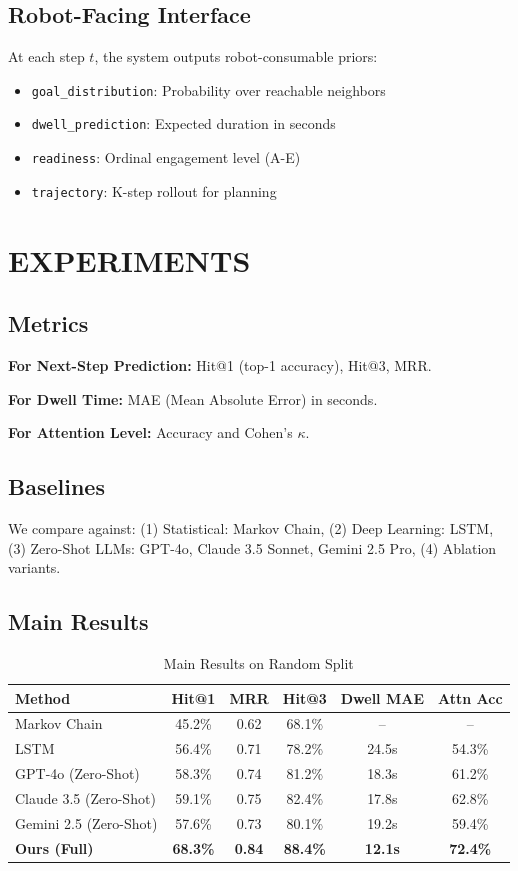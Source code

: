 \documentclass{article}
\begin{document}
\subsection{Robot-Facing Interface}

At each step $t$, the system outputs robot-consumable priors:
\begin{itemize}
    \item \texttt{goal\_distribution}: Probability over reachable neighbors
    \item \texttt{dwell\_prediction}: Expected duration in seconds
    \item \texttt{readiness}: Ordinal engagement level (A-E)
    \item \texttt{trajectory}: K-step rollout for planning
\end{itemize}

\section{EXPERIMENTS}

\subsection{Metrics}

\textbf{For Next-Step Prediction:} Hit@1 (top-1 accuracy), Hit@3, MRR.

\textbf{For Dwell Time:} MAE (Mean Absolute Error) in seconds.

\textbf{For Attention Level:} Accuracy and Cohen's $\kappa$.

\subsection{Baselines}

We compare against: (1) Statistical: Markov Chain, (2) Deep Learning: LSTM, (3) Zero-Shot LLMs: GPT-4o, Claude 3.5 Sonnet, Gemini 2.5 Pro, (4) Ablation variants.

\subsection{Main Results}

\begin{table}[h]
\centering
\caption{Main Results on Random Split}
\begin{tabular}{lccccc}
\toprule
Method & Hit@1 & MRR & Hit@3 & Dwell MAE & Attn Acc \\
\midrule
Markov Chain & 45.2\% & 0.62 & 68.1\% & -- & -- \\
LSTM & 56.4\% & 0.71 & 78.2\% & 24.5s & 54.3\% \\
GPT-4o (Zero-Shot) & 58.3\% & 0.74 & 81.2\% & 18.3s & 61.2\% \\
Claude 3.5 (Zero-Shot) & 59.1\% & 0.75 & 82.4\% & 17.8s & 62.8\% \\
Gemini 2.5 (Zero-Shot) & 57.6\% & 0.73 & 80.1\% & 19.2s & 59.4\% \\
\textbf{Ours (Full)} & \textbf{68.3\%} & \textbf{0.84} & \textbf{88.4\%} & \textbf{12.1s} & \textbf{72.4\%} \\
\bottomrule
\end{tabular}
\end{table}
\end{document}
